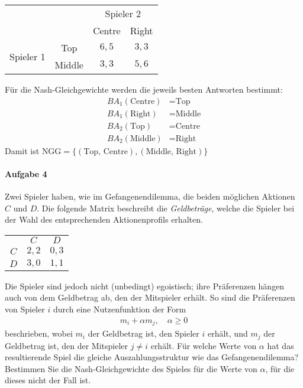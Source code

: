\begin{enumerate}
    \begin{center}
      \begin{tabular}{cccc}
        & & \multicolumn{2}{c}{Spieler 2}\\
        & & Centre & Right\\
        \cmidrule{3-4}
        \multirow{3}{*}{Spieler 1}
        & Top & $6,5$ & $3,3$\\
        \cmidrule{3-4}
        & Middle & $3,3$ & $5,6$\\
        \cmidrule{3-4}
      \end{tabular}
    \end{center}

    Für die Nash-Gleichgewichte werden die jeweils besten Antworten bestimmt:
    \begin{align*}
      BA_1(\text{Centre}) & = \text{Top}\\
      BA_1(\text{Right}) & = \text{Middle}\\
      BA_2(\text{Top}) & = \text{Centre}\\
      BA_2(\text{Middle}) & = \text{Right}
    \end{align*}
    Damit ist $\text{NGG} = \{(\text{Top, Centre}), (\text{Middle, Right})\}$
\end{enumerate}

\paragraph{Aufgabe 4}%
\label{par:serie_2_aufgabe_4}

Zwei Spieler haben, wie im Gefangenendilemma, die beiden möglichen Aktionen $C$ und $D$.
Die folgende Matrix beschreibt die \textit{Geldbeträge}, welche die Spieler bei der Wahl
des entsprechenden Aktionenprofils erhalten.

\begin{center}
  \begin{tabular}{ccc}
    & $C$ & $D$\\
    \cmidrule{2-3}
    $C$ & $2,2$ & $0,3$\\
    \cmidrule{2-3}
    $D$ & $3,0$ & $1,1$\\
    \cmidrule{2-3}
  \end{tabular}
\end{center}

Die Spieler sind jedoch nicht (unbedingt) egoistisch; ihre Präferenzen hängen auch von dem
Geldbetrag ab, den der Mitspieler erhält.
So sind die Präferenzen von Spieler $i$ durch eine Nutzenfunktion der Form
\begin{align*}
  m_i + \alpha m_j, \quad \alpha \geq 0
\end{align*}
beschrieben, wobei $m_i$ der Geldbetrag ist, den Spieler $i$ erhält, und $m_j$ der
Geldbetrag ist, den der Mitspieler $j \neq i$ erhält.
Für welche Werte von $\alpha$ hat das resultierende Spiel die gleiche Auszahlungsstruktur
wie das Gefangenendilemma?
Bestimmen Sie die Nash-Gleichgewichte des Spieles für die Werte von $\alpha$, für die
dieses nicht der Fall ist.

